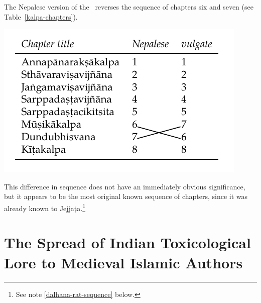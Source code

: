The Nepalese version of the \SS\ reverses the sequence of chapters six and 
seven (see 
Table~\ref{kalpa-chapters}).
%
\begin{table}
    \centering
    \caption{Chapters of the \emph{Kalpasthāna}.}
     \includegraphics[width=0.65\linewidth]
     {chapters/media/kalpa-intro-table-croppedX.pdf}

\label{kalpa-chapters}
\end{table}
%
%
\noindent
This difference in sequence does not have an immediately obvious 
significance, but it appears to be the most original known sequence of 
chapters, since it was already known to Jejjaṭa.\footnote{See note 
\ref{dalhana-rat-sequence} below.}

\section{The Spread of Indian Toxicological Lore to Medieval Islamic  
Authors}

